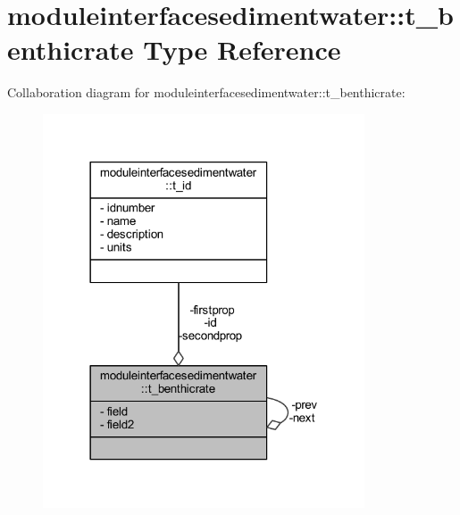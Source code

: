 \hypertarget{structmoduleinterfacesedimentwater_1_1t__benthicrate}{}\section{moduleinterfacesedimentwater\+:\+:t\+\_\+benthicrate Type Reference}
\label{structmoduleinterfacesedimentwater_1_1t__benthicrate}


Collaboration diagram for moduleinterfacesedimentwater\+:\+:t\+\_\+benthicrate\+:\nopagebreak
\begin{figure}[H]
\begin{center}
\leavevmode
\includegraphics[width=270pt]{structmoduleinterfacesedimentwater_1_1t__benthicrate__coll__graph}
\end{center}
\end{figure}
